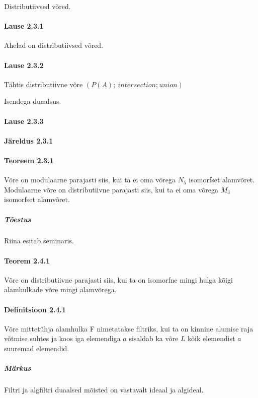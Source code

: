 \documentclass[12pt]{article}
\begin{document}
Distributiivsed võred. 

\paragraph{Lause 2.3.1}

Ahelad on distributiivsed võred.

\paragraph{Lause 2.3.2}

Tähtis distributiivne võre $(P(A); \
intersection; union)$

Isendega duaalsus.

\paragraph{Lause 2.3.3}

\paragraph{Järeldus 2.3.1}

\paragraph{Teoreem 2.3.1}

Võre on modulaarne parajasti siis, kui ta ei oma võrega $N_5$ isomorfset alamvõret. Modulaarne võre on distributiivne parajasti siis, kui ta ei oma võrega $M_3$ isomorfset alamvõret.

\subparagraph{Tõestus}

Riina esitab seminaris.

\paragraph{Teorem 2.4.1}
Võre on distributiivne parajasti siis, kui ta on isomorfne mingi hulga kõigi alamhulkade võre mingi alamvõrega. 

\paragraph{Definitsioon 2.4.1}
Võre mittetühja alamhulka F nimetatakse filtriks, kui ta on kinnine alumise raja võtmise suhtes ja koos iga elemendiga $a$ sisaldab ka võre $L$ kõik elemendist $a$ suuremad elemendid.

\subparagraph{Märkus}
Filtri ja algfiltri duaalsed mõisted on vastavalt ideaal ja algideal.
\end{document}
